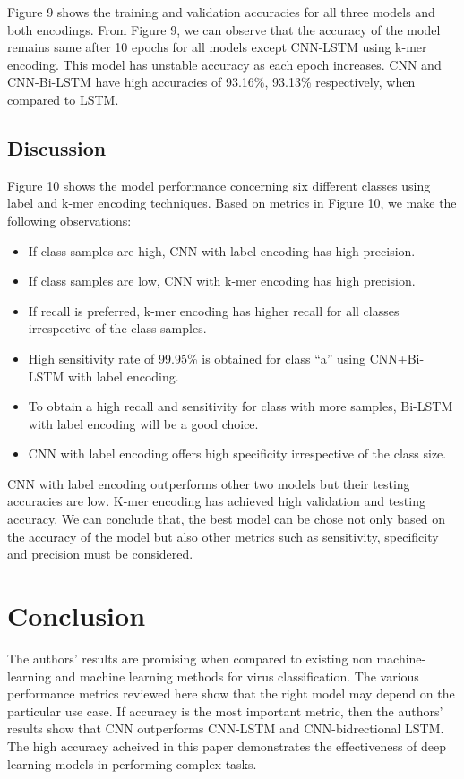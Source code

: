 \documentclass[journal]{IEEEtran}
\begin{document}
    Figure 9 shows the training and validation accuracies for all three models and both encodings.
    From Figure 9, we can observe that the accuracy of the model remains same after 10 epochs for all models
    except CNN-LSTM using k-mer encoding. This model has unstable accuracy as each epoch increases.
    CNN and CNN-Bi-LSTM have high accuracies of 93.16\%, 93.13\% respectively, when compared to LSTM.

    \subsection{Discussion}
      Figure 10 shows the model performance  concerning six different classes using label and k-mer encoding techniques.
      Based on metrics in Figure 10, we make the following observations:
      \begin{itemize}
        \item If class samples are high, CNN with label encoding has high precision.
        \item If class samples are low, CNN with k-mer encoding has high precision.
        \item If recall is preferred, k-mer encoding has higher recall for all classes irrespective of the class samples.
        \item High sensitivity rate of 99.95\% is obtained for class “a” using CNN+Bi-LSTM with label encoding.
        \item To obtain a high recall and sensitivity for class with more samples, Bi-LSTM with label encoding will be a good choice.
        \item CNN with label encoding offers high specificity irrespective of the class size.
      \end{itemize}
      CNN with label encoding outperforms other two models but their testing accuracies are low.
      K-mer encoding has achieved high validation and testing accuracy.
      We can conclude that, the best model can be chose not only based on the accuracy of the model
      but also other metrics such as sensitivity, specificity and precision must be considered.

\section{Conclusion}
  The authors' results are promising when compared to existing non machine-learning and machine learning methods for
  virus classification. The various performance metrics reviewed here show that the right model may depend on the
  particular use case. If accuracy is the most important metric, then the authors' results show that CNN outperforms
  CNN-LSTM and CNN-bidrectional LSTM. The high accuracy acheived in this paper demonstrates the effectiveness of
  deep learning models in performing complex tasks.
\end{document}
